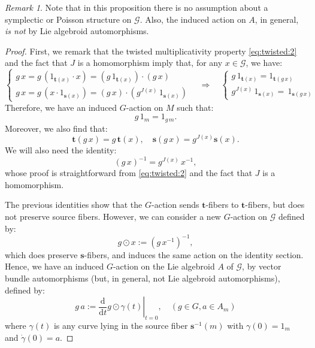 \documentclass[a4paper,11pt]{amsart}
\theoremstyle{definition}
\theoremstyle{remark}
\newtheorem{rem}[thm]{Remark}
\begin{document}
\begin{rem}
Note that in this proposition there is no assumption about a
symplectic or Poisson structure on ${\mathcal{G}}$. Also, the induced action
on $A$, in general, \emph{is not} by Lie algebroid automorphisms.
\end{rem}

\begin{proof}
First, we remark that the twisted multiplicativity property \eqref{eq:twisted:2} and the fact that $J$ is a
homomorphism imply that, for any $x\in{\mathcal{G}}$, we have:
\[
\left\{
\begin{array}{l}
g\, x=g\,(1_{{\mathbf{t}}(x)}\cdot x)=(g\,1_{{\mathbf{t}}(x)})\cdot(g\,x)\\
g\, x=g\,(x\cdot 1_{{\mathbf{s}}(x)})=(g\,x)\cdot(g^{J(x)}\,1_{{\mathbf{s}}(x)})
\end{array}\right.
\quad\Rightarrow\quad
\left\{
\begin{array}{l}
g\,1_{{\mathbf{t}}(x)}=1_{{\mathbf{t}}(g\,x)}\\
g^{J(x)}\,1_{{\mathbf{s}}(x)}=\,1_{{\mathbf{s}}(g\,x)}
\end{array}\right.\]
Therefore, we have an induced $G$-action on $M$ such that:
\[ g\,1_m=1_{g\,m}.\]
Moreover, we also find that:
\[ {\mathbf{t}}(g\,x)=g\,{\mathbf{t}}(x),\quad {\mathbf{s}}(g\,x)=g^{J(x)}{\mathbf{s}}(x).\]
We will also need the identity:
\[ (g\, x)^{-1}=g^{J(x)}\,x^{-1},\]
whose proof is straightforward from \eqref{eq:twisted:2} and the fact that $J$ is a homomorphism.

The previous identities show that the $G$-action sends ${\mathbf{t}}$-fibers
to ${\mathbf{t}}$-fibers, but does not preserve source fibers. However, we
can consider a new $G$-action on ${\mathcal{G}}$ defined by:
\[ g\odot x:=(g\,x^{-1})^{-1},\]
which does preserve ${\mathbf{s}}$-fibers, and induces the same action on
the identity section. Hence, we have an induced $G$-action on the
Lie algebroid $A$ of ${\mathcal{G}}$, by vector bundle automorphisms (but, in
general, not Lie algebroid automorphisms), defined by:
\[ g\,a:=\left.\frac{\mathrm d}{{\mathrm d} t}g\odot \gamma(t)\right|_{t=0},\quad (g\in G, a\in A_m)\]
where $\gamma(t)$ is any curve lying in the source fiber
${\mathbf{s}}^{-1}(m)$ with $\gamma(0)=1_m$ and $\dot{\gamma}(0)=a$.


\end{proof}
\end{document}
